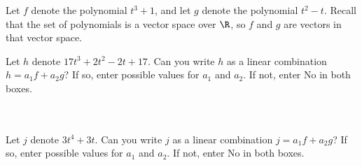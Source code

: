 \endedxproblem



Let $f$ denote the polynomial $t^3  + 1$, and let $g$ denote the
polynomial $t^2 - t$.  Recall that the set of polynomials is a vector space over $\R$, so $f$ and $g$
are vectors in that vector space.  

Let $h$ denote $17t^3 + 2t^2 - 2t + 17$.
Can you write $h$  as a linear combination $h = a_1 f + a_2 g$?  If so, enter possible values for $a_1$ and
$a_2$.  If not, enter No in both boxes.  

\\
\\


Let $j$ denote $3t^4 + 3t$.
Can you write $j$  as a linear combination $j = a_1 f + a_2 g$?  If so, enter possible values for $a_1$ and
$a_2$.  If not, enter No in both boxes.  

\\
\\


